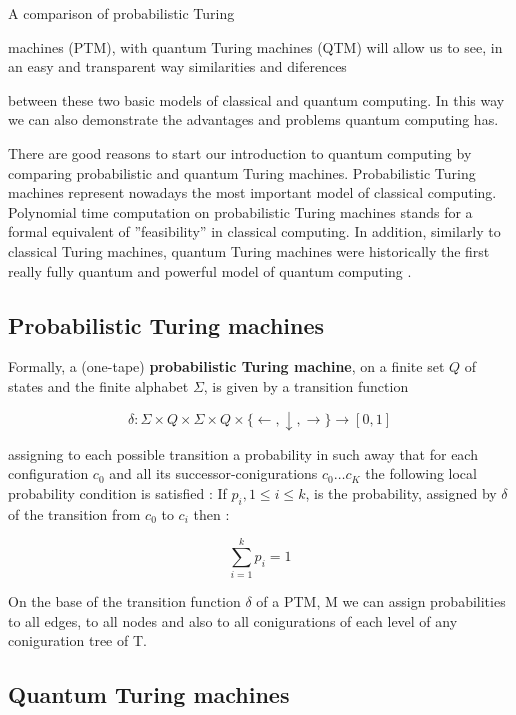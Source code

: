 \documentclass[12pt]{book}
\begin{document}
A comparison of probabilistic Turing
  
machines (PTM), with quantum Turing machines
 (QTM)  will allow us to see,  in an easy and transparent way 
similarities and diferences

between these two basic models of classical and quantum 
computing. In this way we can
also demonstrate the advantages and problems quantum 
computing has.

There are good reasons to start our introduction to quantum 
computing by comparing probabilistic and quantum Turing 
machines. Probabilistic Turing machines represent
nowadays the most important model of classical computing.  
Polynomial time computation
on probabilistic Turing machines stands for a formal 
equivalent of ''feasibility''  in classical
computing.  In addition,  similarly to classical Turing 
machines,  quantum Turing machines
were historically the first really fully quantum and powerful 
model of quantum computing .


\subsection{Probabilistic Turing machines}

Formally, a (one-tape) \textbf{probabilistic Turing machine}, on a finite set $Q$ of states and the finite alphabet $\Sigma$, is given by a transition function

$$
\delta : \Sigma \times Q \times \Sigma \times Q \times \{ \leftarrow, \downarrow , \rightarrow  \} \to [0,1]
$$


assigning to each possible transition a probability in such away that for each configuration $c_{0}$ and all its successor-conigurations $c_{0} \dots c_{K}$
 the following local probability condition
is satisfied : If $p_{i} , 1 \leq i \leq k$, is the probability, assigned by $\delta$ of the transition from 
$c_{0}$ to $c_{i}$ then :


$$
\sum_{i=1}^{k}{p_{i}} = 1
$$


On the base of the transition function $\delta$ of a PTM, M we can assign probabilities to all edges, to all nodes and also to all conigurations of each level of any coniguration tree of T.



\subsection{
Quantum Turing machines
}
\end{document}
